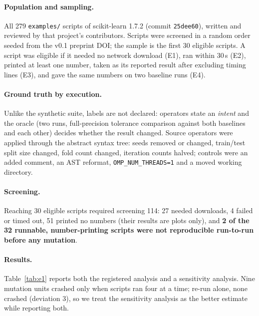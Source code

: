 \documentclass[11pt]{article}
\begin{document}
\paragraph{Population and sampling.} All 279 \texttt{examples/} scripts of scikit-learn 1.7.2 (commit \texttt{25dee60}), written and reviewed by that project's contributors. Scripts were screened in a random order seeded from the v0.1 preprint DOI; the sample is the first 30 eligible scripts. A script was eligible if it needed no network download (E1), ran within 30\,s (E2), printed at least one number, taken as its reported result after excluding timing lines (E3), and gave the same numbers on two baseline runs (E4).

\paragraph{Ground truth by execution.} Unlike the synthetic suite, labels are not declared: operators state an \emph{intent} and the oracle (two runs, full-precision tolerance comparison against both baselines and each other) decides whether the result changed. Source operators were applied through the abstract syntax tree: seeds removed or changed, train/test split size changed, fold count changed, iteration counts halved; controls were an added comment, an AST reformat, \texttt{OMP\_NUM\_THREADS=1} and a moved working directory.

\paragraph{Screening.} Reaching 30 eligible scripts required screening 114: 27 needed downloads, 4 failed or timed out, 51 printed no numbers (their results are plots only), and \textbf{2 of the 32 runnable, number-printing scripts were not reproducible run-to-run before any mutation}.

\paragraph{Results.} Table~\ref{tab:e1} reports both the registered analysis and a sensitivity analysis. Nine mutation units crashed only when scripts ran four at a time; re-run alone, none crashed (deviation 3), so we treat the sensitivity analysis as the better estimate while reporting both.
\end{document}
